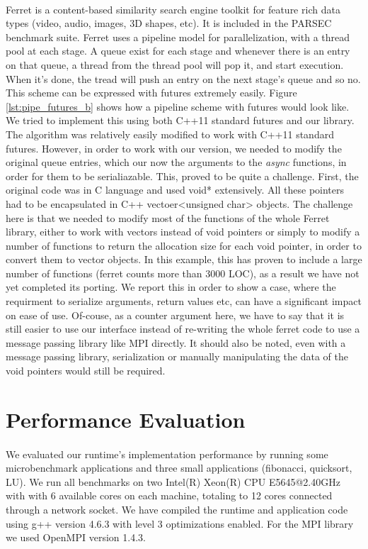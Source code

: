 \paragraph{}
Ferret is a content-based similarity search engine toolkit for feature rich
data types (video, audio, images, 3D shapes, etc).  It is included in the PARSEC benchmark suite.
Ferret uses a pipeline model for parallelization, 
with a thread pool at each stage.  A queue exist for each stage and whenever
there is an entry on that queue, a thread from the thread pool will pop it, and start execution.  When it's
done, the tread will push an entry on the next stage's queue and so no.  This scheme can be expressed with
futures extremely easily.  Figure \ref{lst:pipe_futures_b} shows how a pipeline scheme with futures would 
look like.  We tried to implement this using both C++11 standard futures and our library.  The algorithm
was relatively easily modified to work with C++11 standard futures.  However, in order to work with our
version, we needed to modify the original queue entries, which our now the arguments to the \emph{async}
functions, in order for them to be serialiazable.  This, proved to be quite a challenge.  First, the original
code was in C language and used void* extensively.  All these pointers had to be encapsulated in 
C++ vectoer<unsigned char> objects.  The challenge here is that we needed to modify most of the functions
of the whole Ferret library, either to work with vectors instead of void pointers or simply to modify a 
number of functions to return the allocation size for each void pointer, in order to convert 
them to vector objects.  In this example, this has proven to include a large number of functions (ferret
counts more than 3000 LOC), as a result we have not yet completed its porting.  We report this in order
to show a case, where the requirment to serialize arguments, return values etc, can have a significant
impact on ease of use.  Of-couse, as a counter argument here, we have to say that it is still easier to 
use our interface instead of re-writing the whole ferret code to use a message passing library like MPI
directly.  It should also be noted, even with a message passing library, serialization or manually
manipulating the data of the void pointers would still be required.  

  
\section{Performance Evaluation}
\label{sect:eval_intro}
\paragraph{}
	We evaluated our runtime's implementation performance by running some microbenchmark applications and
three small applications (fibonacci, quicksort, LU).  We run all benchmarks on two Intel(R) Xeon(R) 
CPU E5645@2.40GHz with with 6 available cores on each machine, totaling to 12 cores connected through 
a network socket. We have compiled the runtime and application code using g++ version 4.6.3 with 
level 3 optimizations enabled.  For the MPI library we used OpenMPI version 1.4.3.

